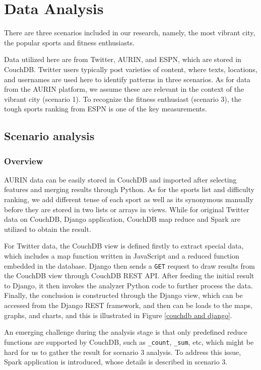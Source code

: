 
\section{Data Analysis}

There are three scenarios included in our research, namely, the most vibrant city, the popular sports and fitness enthusiasts. 

Data utilized here are from Twitter, AURIN, and ESPN, which are stored in CouchDB. Twitter users typically post varieties of content, where texts, locations, and usernames are used here to identify patterns in three scenarios. As for data from the AURIN platform, we assume these are relevant in the context of the vibrant city (scenario 1). To recognize the fitness enthusiast (scenario 3), the tough sports ranking from ESPN is one of the key measurements.


\subsection{Scenario analysis}

\subsubsection{Overview}
AURIN data can be easily stored in CouchDB and imported after selecting features and merging results through Python. As for the sports list and difficulty ranking, we add different tense of each sport as well as its synonymous manually before they are stored in two lists or arrays in views. While for original Twitter data on CouchDB, Django application, CouchDB map reduce and Spark are utilized to obtain the result. 

For Twitter data, the CouchDB view is defined firstly to extract special data, which includes a map function written in JavaScript and a reduced function embedded in the database. Django then sends a \texttt{GET} request to draw results from the CouchDB view through CouchDB REST API. After feeding the initial result to Django, it then invokes the analyzer Python code to further process the data. Finally, the conclusion is constructed through the Django view, which can be accessed from the Django REST framework, and then can be loads to the maps, graphs, and charts, and this is illustrated in Figure \ref{couchdb and django}.

An emerging challenge during the analysis stage is that only predefined reduce functions are supported by CouchDB, such as \texttt{_count}, \texttt{_sum}, etc, which might be hard for us to gather the result for scenario 3 analysis. To address this issue, Spark application is introduced, whose details is described in scenario 3. 


